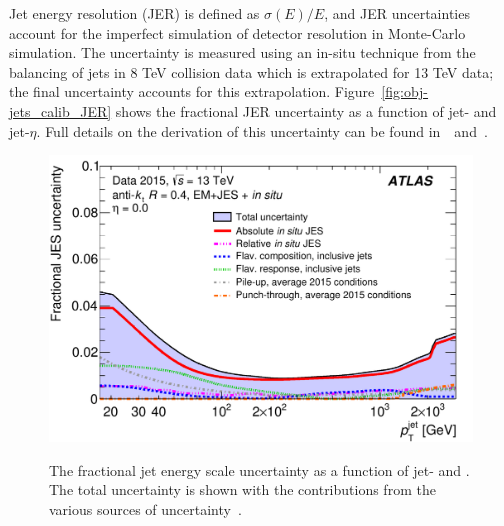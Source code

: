 Jet energy resolution (JER) is defined as $\sigma(E)/E$, and JER uncertainties
account for the imperfect simulation of detector resolution in Monte-Carlo simulation.
The uncertainty is measured using an in-situ technique from the balancing of jets in 8 TeV collision data
which is extrapolated for 13 TeV data; the final uncertainty accounts for this extrapolation.
Figure~\ref{fig:obj-jets_calib_JER} shows the fractional JER uncertainty as a function of jet-\pT{} and jet-$\eta$.
Full details on the derivation of this uncertainty can be found in~\cite{obj-jets_calib_2015}~and~\cite{obj-jets_calib_JER_8TeV}.

\begin{figure}[!htb]
  \begin{center}
    \captionsetup[subfigure]{aboveskip=0pt,justification=centering}
     {\includegraphics[width=0.4\linewidth, angle=0]{figs/Objects/jets_uncert_JES_pt.pdf} }
  \end{center}
 \vspace{-1em}
  \caption[The fractional jet energy scale uncertainty as a function of jet-\pT{} and \eta.]
          { \label{fig:obj-jets_calib_JES} The fractional jet energy scale uncertainty as a function of jet-\pT{} and \eta.
            The total uncertainty is shown with the contributions from the various sources of uncertainty~\cite{obj-jets_calib_run2}.}
 \vspace{0.2em}
  \begin{center}      
    \captionsetup[subfigure]{aboveskip=0pt,justification=centering}

\end{center}
\end{figure}

